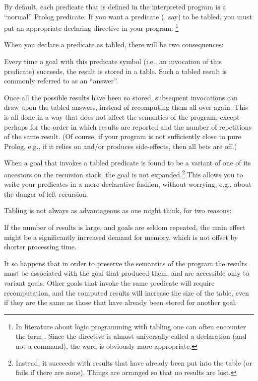 By default, each predicate that is defined in the interpreted program is a
``normal'' Prolog predicate.  If you want a predicate (, say) to be
tabled, you must put an appropriate declaring directive in your
program:%
\footnote{
    In literature about logic programming with tabling one can often
    encounter the form .  Since the directive is
    almost universally called a declaration (and not a command), the word
     is obviously more appropriate.}\\
\ind{}

When you declare a predicate as tabled, there will be
two consequences:
\begin{Enumerate}
\item
  Every time a goal with this predicate symbol (i.e., an invocation of this
  predicate) succeeds, the result is stored in a table.  Such a tabled result
  is commonly referred to as an ``answer''.

  Once all the possible results have been so stored, subsequent invocations
  can draw upon the tabled answers, instead of recomputing them all over
  again. This is all done in a way that does not affect the semantics of the
  program, except perhaps for the order in which results are reported and the
  number of repetitions of the same result. (Of course, if your program is
  not sufficiently close to pure Prolog, e.g., if it relies on and/or
  produces side-effects, then all bets are off.)

\item
  When a goal that invokes a tabled predicate is found to be a variant of one
  of its ancestors on the recursion stack, the goal is not
  expanded.\footnote{
    Instead, it succeeds with results that have already been put into the
    table (or fails if there are none).  Things are arranged so that no
    results are lost.}
  This allows you to write your predicates in a more declarative fashion,
  without worrying, e.g., about the danger of left recursion.
\end{Enumerate}


Tabling is not always as advantageous as one might think, for two reasons:
  \begin{Enumerate}
  \item
    If the number of results is large, and goals are seldom repeated, the
    main effect might be a significantly increased demand for memory, which
    is not offset by shorter processing time.

  \item It so happens that in order to preserve the semantics of the program
    the results must be associated with the goal that produced them, and are
    accessible only to variant goals.  Other goals that invoke the same
    predicate will require recomputation, and the computed results will
    increase the size of the table, even if they are the same as those that
    have already been stored for another goal.
  \end{Enumerate}


